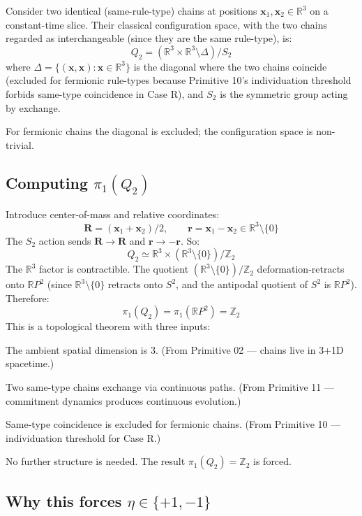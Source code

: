 \documentclass[11pt,a4paper]{article}
\begin{document}
Consider two identical (same-rule-type) chains at positions $\mathbf{x}_1, \mathbf{x}_2 \in \mathbb{R}^3$ on a constant-time slice. Their classical configuration space, with the two chains regarded as interchangeable (since they are the same rule-type), is:
\[
Q_2 = (\mathbb{R}^{3} \times \mathbb{R}^{3} \setminus \Delta) / S_2
\]
where $\Delta = \{(\mathbf{x}, \mathbf{x}) : \mathbf{x} \in \mathbb{R}^3\}$ is the diagonal where the two chains coincide (excluded for fermionic rule-types because Primitive 10's individuation threshold forbids same-type coincidence in Case R), and $S_2$ is the symmetric group acting by exchange.

For fermionic chains the diagonal is excluded; the configuration space is non-trivial.

\subsection{Computing $\pi_1(Q_2)$}

Introduce center-of-mass and relative coordinates:
\[
\mathbf{R} = (\mathbf{x}_1 + \mathbf{x}_2)/2, \qquad \mathbf{r} = \mathbf{x}_1 - \mathbf{x}_2 \in \mathbb{R}^{3} \setminus \{0\}
\]
The $S_2$ action sends $\mathbf{R} \to \mathbf{R}$ and $\mathbf{r} \to -\mathbf{r}$. So:
\[
Q_2 \simeq \mathbb{R}^{3} \times (\mathbb{R}^{3} \setminus \{0\}) / \mathbb{Z}_2
\]
The $\mathbb{R}^3$ factor is contractible. The quotient $(\mathbb{R}^3 \setminus \{0\})/\mathbb{Z}_2$ deformation-retracts onto $\mathbb{R}P^2$ (since $\mathbb{R}^3 \setminus \{0\}$ retracts onto $S^2$, and the antipodal quotient of $S^2$ is $\mathbb{R}P^2$). Therefore:
\[
\pi_1(Q_2) = \pi_1(\mathbb{R}P^{2}) = \mathbb{Z}_2
\]
This is a topological theorem with three inputs:

The ambient spatial dimension is 3. (From Primitive 02 --- chains live in 3+1D spacetime.)

Two same-type chains exchange via continuous paths. (From Primitive 11 --- commitment dynamics produces continuous evolution.)

Same-type coincidence is excluded for fermionic chains. (From Primitive 10 --- individuation threshold for Case R.)

No further structure is needed. The result $\pi_1(Q_2) = \mathbb{Z}_2$ is forced.

\subsection{Why this forces $\eta \in \{+1, -1\}$}
\end{document}
